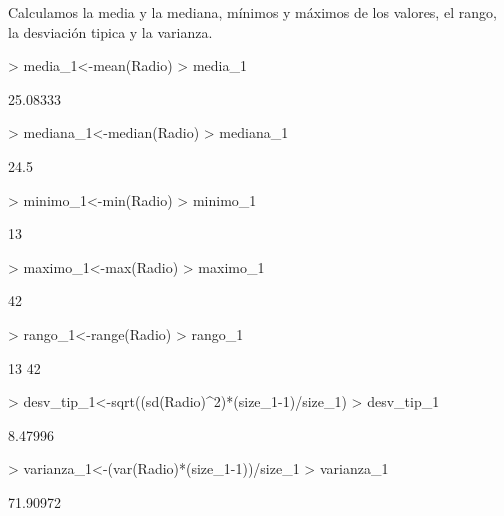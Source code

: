 \documentclass[a4paper]{article}
\begin{document}
Calculamos la media y la mediana, mínimos y máximos de los valores, el rango, la desviación tipica y la varianza.
\begin{Schunk}
\begin{Sinput}
> media_1<-mean(Radio)
> media_1
\end{Sinput}
\begin{Soutput}
[1] 25.08333
\end{Soutput}
\begin{Sinput}
> mediana_1<-median(Radio)
> mediana_1
\end{Sinput}
\begin{Soutput}
[1] 24.5
\end{Soutput}
\begin{Sinput}
> minimo_1<-min(Radio)
> minimo_1
\end{Sinput}
\begin{Soutput}
[1] 13
\end{Soutput}
\begin{Sinput}
> maximo_1<-max(Radio)
> maximo_1
\end{Sinput}
\begin{Soutput}
[1] 42
\end{Soutput}
\begin{Sinput}
> rango_1<-range(Radio)
> rango_1
\end{Sinput}
\begin{Soutput}
[1] 13 42
\end{Soutput}
\begin{Sinput}
> desv_tip_1<-sqrt((sd(Radio)^2)*(size_1-1)/size_1)
> desv_tip_1
\end{Sinput}
\begin{Soutput}
[1] 8.47996
\end{Soutput}
\begin{Sinput}
> varianza_1<-(var(Radio)*(size_1-1))/size_1
> varianza_1
\end{Sinput}
\begin{Soutput}
[1] 71.90972
\end{Soutput}
\end{Schunk}
\end{document}
